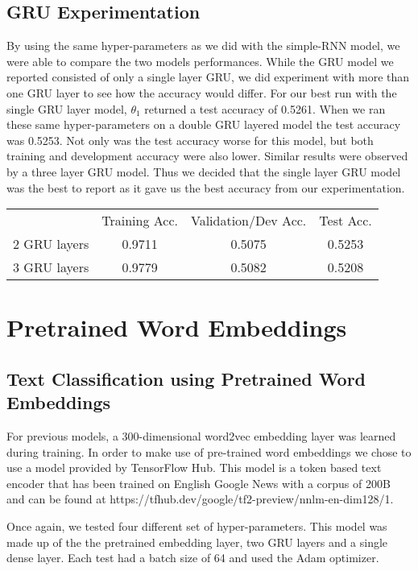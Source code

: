 \documentclass[12pt,notitlepage]{article}
\begin{document}
\subsection{GRU Experimentation}
\tab By using the same hyper-parameters as we did with the simple-RNN model, we were able to compare the two models performances. While the GRU model we reported consisted of only a single layer GRU, we did experiment with more than one GRU layer to see how the accuracy would differ. For our best run with the single GRU layer model, $\theta_{1}$ returned a test accuracy of 0.5261. When we ran these same hyper-parameters on a double GRU layered model the test accuracy was 0.5253. Not only was the test accuracy worse for this model, but both training and development accuracy were also lower. Similar results were observed by a three layer GRU model. Thus we decided that the single layer GRU model was the best to report as it gave us the best accuracy from our experimentation.
\begin{table}[H]
	\centering
		\begin{tabular}{lccc}
			& \multicolumn{1}{c}{Training Acc.}
			& \multicolumn{1}{c}{Validation/Dev Acc.}
			& \multicolumn{1}{c}{Test Acc.} \\
			\cline{2-4} 
			\multicolumn{1}{l}{2 GRU layers}
			& \multicolumn{1}{|c|}{0.9711}
			& \multicolumn{1}{c|}{0.5075}
			& \multicolumn{1}{c|}{0.5253} \\
			\cline{2-4} 
			\multicolumn{1}{l}{3 GRU layers}
			& \multicolumn{1}{|c|}{0.9779}
			& \multicolumn{1}{c|}{0.5082}
			& \multicolumn{1}{c|}{0.5208} \\
			\cline{2-4}
		\end{tabular}
\end{table}    

\section{Pretrained Word Embeddings}
\subsection{Text Classification using Pretrained Word Embeddings}
\tab For previous models, a 300-dimensional word2vec embedding layer was learned during training. In order to make use of pre-trained word embeddings we chose to use a model provided by TensorFlow Hub. This model is a token based text encoder that has been trained on English Google News with a corpus of 200B and can be found at https://tfhub.dev/google/tf2-preview/nnlm-en-dim128/1.
\par Once again, we tested four different set of hyper-parameters. This model was made up of the the pretrained embedding layer, two GRU layers and a single dense layer. Each test had a batch size of 64 and used the Adam optimizer. 
\end{document}
